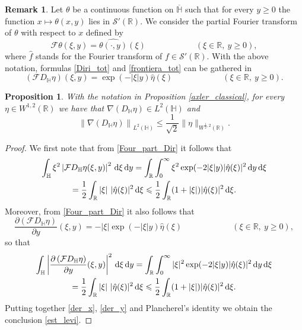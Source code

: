 \documentclass{amsart} %
\numberwithin{equation}{section}
\newtheorem{proposition}[theorem]{Proposition}
\theoremstyle{definition}
\newtheorem{remark}[theorem]{Remark}
\begin{document}
\begin{remark}\label{rem_Four_first}
Let $\theta$ be a continuous function on $\overline{\mathbb{H}}$ such that for every $y\geqslant 0$ the function $x\mapsto \theta(x,y)$ lies in $\mathcal{S}'(\mathbb{R})$. We consider the partial Fourier transform of $\theta$ with respect to $x$ defined by
$$
\mathcal{F}\theta(\xi,y)=\widehat{\theta(\cdot,y)}(\xi) \qquad\qquad\qquad(\xi\in \mathbb{R},\ y \geqslant 0),
$$
where $\hat f$ stands for the Fourier transform of $f\in \mathcal{S}'(\mathbb{R})$.
With the above notation, formulas \eqref{Diri_tot} and \eqref{frontiera_tot} can be gathered in
\begin{equation}\label{Four_part_Dir}
\left(\mathcal{F} {D_\mathbb{H}} \eta\right)(\xi,y)=\exp(-|\xi|y) \hat\eta(\xi) \qquad\qquad\qquad(\xi\in \mathbb{R},\ y\geqslant 0).
\end{equation}
\end{remark}
\begin{proposition}\label{grad_L2}
With the notation in Proposition \ref{axler_classical}, for every $\eta\in W^{1,2}(\mathbb{R})$
we have that $\nabla(D_\mathbb{H} \eta)\in L^2(\mathbb{H})$ and
\begin{equation}\label{est_levi}
\left\|\nabla(D_\mathbb{H} \eta) \right\|_{L^2(\mathbb{H})}
\leqslant \frac{1}{\sqrt{2}} \|\eta\|_{W^{\frac12,2}(\mathbb{R})}.
\end{equation}
\end{proposition}

\begin{proof}
We first note that from \eqref{Four_part_Dir} it follows that
\begin{multline}\label{der_x}
\int_\mathbb{H} \xi^2 \left|\mathcal{F} {D_\mathbb{H}} \eta(\xi,y)\right|^2\, {\rm d}\xi\, {\rm d}y
=\int_\mathbb{R} \int_0^\infty \xi^2 \exp(-2|\xi|y) |\hat\eta(\xi)|^2 \, {\rm d}y\, {\rm d}\xi
\\=\frac12 \int_\mathbb{R} |\xi| \ |\hat\eta(\xi)|^2 \,  {\rm d}\xi \leqslant \frac12 \int_\mathbb{R} (1+|\xi|) |\hat\eta(\xi)|^2 \,  {\rm d}\xi .
\end{multline}
Moreover, from \eqref{Four_part_Dir} it also follows that
\begin{equation}\label{der_in_y}
\frac{\partial\left(\mathcal{F} {D_\mathbb{H}} \eta\right)}{\partial y}(\xi,y)=-|\xi| \exp(-|\xi|y) \hat\eta(\xi) \qquad\qquad\qquad(\xi\in \mathbb{R},\ y\geqslant 0),
\end{equation}
so that 
\begin{multline}\label{der_y}
\int_\mathbb{H} \left| \frac{\partial\left(\mathcal{F} {D_\mathbb{H}} \eta\right)}{\partial y}(\xi,y) \right|^2\, {\rm d}\xi\, {\rm d}y
=\int_\mathbb{R}\int_0^\infty |\xi|^2 \exp(-2|\xi|y) |\hat\eta(\xi)|^2\, {\rm d}y\, {\rm d}\xi
\\=\frac12 \int_\mathbb{R} |\xi|\ |\hat\eta(\xi)|^2 \,  {\rm d}\xi \leqslant \frac12 \int_\mathbb{R} (1+|\xi|) |\hat\eta(\xi)|^2 \,  {\rm d}\xi .
\end{multline}
Putting together \eqref{der_x}, \eqref{der_y} and Plancherel's identity we obtain the conclusion \eqref{est_levi}. 
\end{proof}
\end{document}
